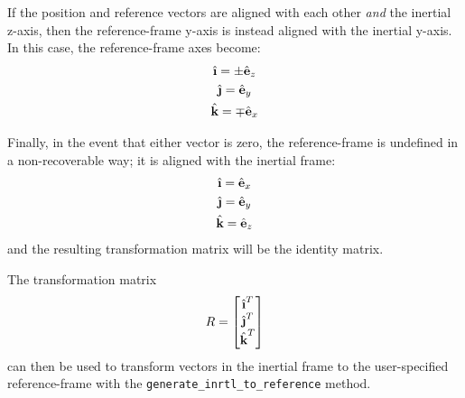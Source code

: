 \documentclass[11pt,fleqn]{report}
\begin{document}
If the position and reference vectors are aligned with each other \textit{and}
the inertial z-axis, then the reference-frame
y-axis is instead aligned with the inertial y-axis. In this case, the
reference-frame axes become:
\begin{multline}
 \hat{\textbf{\i}} = \pm \hat{\textbf{e}}_z \\
 \hat{\textbf{\j}} = \hat{\textbf{e}}_y \\
 \hat{\textbf{k}}= \mp \hat{\textbf{e}}_x \hfill
 \label{eq:ref_z}
\end{multline}

Finally, in the event that either vector is zero, the reference-frame is
undefined in a non-recoverable way; it is aligned with the inertial frame:
\begin{multline}
 \hat{\textbf{\i}} = \hat{\textbf{e}}_x \\
 \hat{\textbf{\j}} = \hat{\textbf{e}}_y \\
 \hat{\textbf{k}}= \hat{\textbf{e}}_z \hfill
\end{multline}
and the resulting transformation matrix will be the identity matrix.

The transformation matrix
\begin{equation}
 \hfill R = \begin{bmatrix}
 \hat{\textbf{\i}}^T \\
 \hat{\textbf{\j}}^T \\
 \hat{\textbf{k}}^T
\end{bmatrix} \hfill
 \label{eq:ref_mat}
\end{equation}
can then be used to transform vectors in the inertial frame to the
user-specified reference-frame 
with the \texttt{generate\_inrtl\_to\_reference} method.
\end{document}
